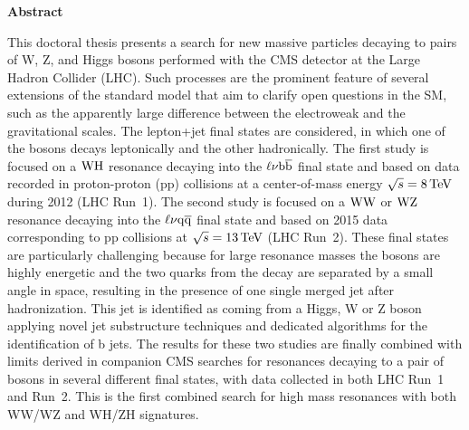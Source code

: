 \vspace*{\fill}

\begin{center}
\Large
\textbf{Abstract}
\end{center}

\small
\noindent This doctoral thesis presents a search for new massive particles decaying to pairs of W, Z, and Higgs bosons performed with the CMS detector at the Large Hadron Collider (LHC).
Such processes are the prominent feature of several extensions of the standard model that aim to clarify open questions in the SM, such as the apparently large difference between the electroweak and the gravitational scales. 
The lepton+jet final states are considered, in which one of the bosons decays leptonically and the other hadronically. 
The first study is focused on a $\mathrm{W}\mathrm{H}$ resonance decaying into the $\ell\nu{\mathrm{b}\overline{\mathrm{b}}}$ final state and based on data recorded in proton-proton (pp) collisions at a center-of-mass energy $\sqrt{s} = 8\,\text{Te\hspace{-.08em}V}$ during 2012 (LHC Run~1).
The second study is focused on a $\mathrm{W}\mathrm{W}$ or $\mathrm{W}\mathrm{Z}$ resonance decaying into the $\ell\nu\mathrm{q}\overline{\mathrm{q}}$ final state and based on 2015 data corresponding to pp collisions at $\sqrt{s} = 13\,\text{Te\hspace{-.08em}V}$ (LHC Run~2).
These final states are particularly challenging because for large resonance masses the bosons are highly energetic and the two quarks from the decay are separated by a small angle in space, resulting in the presence of one single merged jet after hadronization. This jet is identified as coming from a Higgs, W or Z boson applying novel jet substructure techniques and dedicated algorithms for the identification of b jets.
The results for these two studies are finally combined with limits derived in companion CMS searches for resonances decaying to a pair of bosons in several different final states, with data collected in both LHC Run~1 and Run~2.
This is the first combined search for high mass resonances with both WW/WZ and WH/ZH signatures.\\

